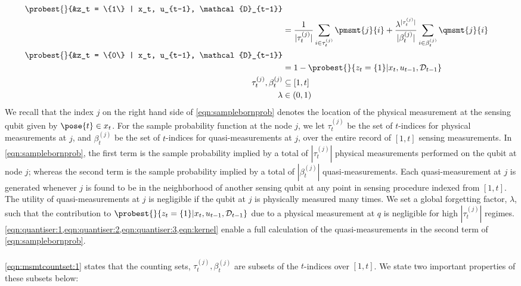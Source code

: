\begin{align}
\probest{}{&z_t = \{1\} | x_t, u_{t-1}, \mathcal{D}_{t-1}} \nonumber \\ 
&=  \frac{1}{|\tau^{(j)}_t|}\sum_{i \in \tau^{(j)}_t} \pmsmt{j}{i} + \frac{\lambda^{|\tau^{(j)}_t|}}{|\beta^{(j)}_t|}\sum_{i \in \beta^{(j)}_t } \qmsmt{j}{i}  \label{eqn:samplebornprob} \\ 
\probest{}{&z_t = \{0\} | x_t, u_{t-1}, \mathcal{D}_{t-1}} \nonumber \\
&= 1 - \probest{}{z_t = \{1\} | x_t, u_{t-1}, \mathcal{D}_{t-1}} \\
\tau^{(j)}_t , \beta^{(j)}_t & \subseteq [1, t] \label{eqn:msmtcountset:1}  \\
\lambda & \in (0,1) \label{eqn:forgettingfactor} 
\end{align} We recall that the index $j$  on the right hand side of \cref{eqn:samplebornprob} denotes the location of the physical measurement at the sensing qubit given by $\pose{t} \in x_t$. For the sample probability function at the node $j$, we let $\tau^{(j)}_t $ be the set of $t$-indices for physical measurements at $j$, and $ \beta^{(j)}_t $ be the set of $t$-indices for quasi-measurements at $j$, over the entire record of $[1, t]$ sensing measurements. In \cref{eqn:samplebornprob}, the first term is the sample probability  implied by a total of $|\tau^{(j)}_t|$ physical measurements performed on the qubit at node $j$; whereas the second term is the sample probability  implied by a total of $|\beta^{(j)}_t|$ quasi-measurements. Each quasi-measurement at $j$ is generated whenever $j$ is found to be in the neighborhood of another sensing qubit at any point in sensing procedure indexed from $[1, t]$. The utility of quasi-measurements at $j$ is negligible if the qubit at $j$ is physically measured many times. We set a global forgetting factor, $\lambda$, such that the contribution to $\probest{}{z_t = \{1\} | x_t, u_{t-1}, \mathcal{D}_{t-1}}$ due to a physical measurement at $q$ is negligible for high $|\tau^{(j)}_t|$ regimes. \cref{eqn:quantiser:1,eqn:quantiser:2,eqn:quantiser:3,eqn:kernel} enable a full calculation of the quasi-measurements in the second term of \cref{eqn:samplebornprob}. \\
\\
\cref{eqn:msmtcountset:1} states that the counting sets, $\tau^{(j)}_t, \beta^{(j)}_t$ are subsets of the $t$-indices over $[1,t]$. We state two important properties of these subsets below:
